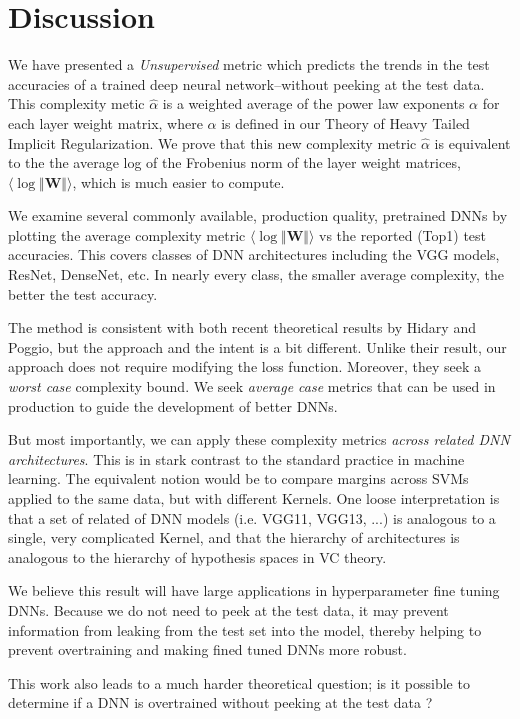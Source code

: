\vspace{-4mm}
\section{Discussion}
\label{sxn:discussion}
\vspace{-3mm}

We have presented a \emph{Unsupervised} metric which  predicts the trends in the test accuracies of a trained deep neural network--without peeking at the test data. This complexity metic $\hat{\alpha}$ is a weighted average of the power law exponents $\alpha$ for each layer weight matrix, where 
$\alpha$ is defined in our Theory of Heavy Tailed Implicit Regularization.   We prove that this new complexity metric $\hat{\alpha}$ is equivalent to the the average log of the Frobenius norm of the layer weight matrices, $\langle\log\Vert\mathbf{W}\Vert\rangle$, which is much easier to compute.

We examine several  commonly available, production quality, pretrained DNNs  by plotting  the average complexity metric $\langle\log\Vert\mathbf{W}\Vert\rangle$ vs the reported (Top1) test accuracies. This covers classes of DNN architectures including the VGG models, ResNet, DenseNet, etc.  In nearly every class, the smaller average complexity, the better the test accuracy.


The method is consistent with both recent theoretical results by Hidary and Poggio, but the approach and the intent is a bit different. 
Unlike their result, our approach does not require modifying the loss function.
Moreover, they seek a \emph{worst case} complexity bound.  We seek \emph{average case} metrics that can be used in production
to guide the development of better DNNs.

But most importantly, we can apply these complexity metrics \emph{across related DNN architectures}. This is in stark contrast to the standard practice in machine learning.  The equivalent notion would be to compare margins across SVMs  applied to the same data, but with different Kernels.  One loose interpretation is that a set of related of DNN models
(i.e. VGG11, VGG13, ...) is analogous to a single, very complicated Kernel, and that the hierarchy of architectures is analogous to the hierarchy of hypothesis spaces in VC theory. 

We believe this result will have large applications in hyperparameter fine tuning DNNs.  Because we do not need to peek at the test data, it may prevent information from leaking from the test set into the model, thereby helping to prevent overtraining and making fined tuned DNNs more robust.

This work also leads to a much harder theoretical question; is it possible to determine if a DNN is overtrained without peeking at the test data ?  

